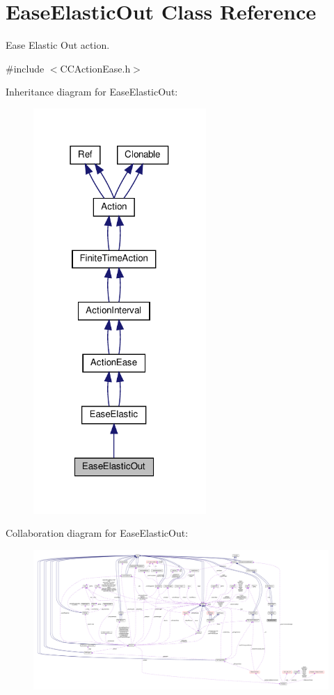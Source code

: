 \hypertarget{classEaseElasticOut}{}\section{Ease\+Elastic\+Out Class Reference}
\label{classEaseElasticOut}


Ease Elastic Out action.  




{\ttfamily \#include $<$C\+C\+Action\+Ease.\+h$>$}



Inheritance diagram for Ease\+Elastic\+Out\+:
\nopagebreak
\begin{figure}[H]
\begin{center}
\leavevmode
\includegraphics[width=186pt]{classEaseElasticOut__inherit__graph}
\end{center}
\end{figure}


Collaboration diagram for Ease\+Elastic\+Out\+:
\nopagebreak
\begin{figure}[H]
\begin{center}
\leavevmode
\includegraphics[width=350pt]{classEaseElasticOut__coll__graph}
\end{center}
\end{figure}
